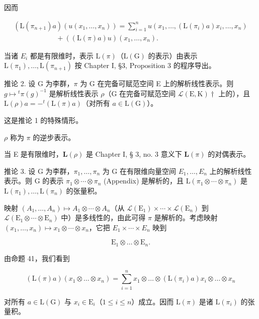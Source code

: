 因而

\[
\begin{array}{l} (\mathrm{L} (\pi_ {n + 1}) a) (u (x _ {1}, \ldots , x _ {n})) = \sum_ {i = 1} ^ {n} u (x _ {1}, \ldots , (\mathrm{L} (\pi_ {i}) a) x _ {i}, \ldots , x _ {n}) \\ \qquad \qquad \qquad + ((\mathrm{L} (\pi) a) u) (x _ {1}, \ldots , x _ {n}). \end{array}
\]

当诸 \(E_{i}\) 都是有限维时，表示 \(\mathrm{L}(\pi)\)（\(\mathrm{L}(\mathrm{G})\) 的表示）由表示 \(\mathrm{L}(\pi_{1}),\ldots,\mathrm{L}(\pi_{n+1})\) 按 Chapter I, §3, Proposition 3 的程序导出。

推论 2. 设 G 为李群，\(\pi\) 为 G 在完备可赋范空间 E 上的解析线性表示。则 \(g \mapsto {}^{t}\pi(g)^{-1}\) 是解析线性表示 \(\rho\)（G 在完备可赋范空间 \(\mathcal{L}(\mathrm{E}, \mathrm{K})\dagger\) 上的），且 \(\mathrm{L}(\rho)a = -{}^{t}(\mathrm{L}(\pi)a)\)（对所有 \(a \in \mathrm{L}(\mathrm{G})\)）。

这是推论 1 的特殊情形。

\(\rho\) 称为 \(\pi\) 的逆步表示。

当 E 是有限维时，\(\mathbf{L}(\rho)\) 是 Chapter I, § 3, no. 3 意义下 \(\mathbf{L}(\pi)\) 的对偶表示。

推论 3. 设 G 为李群，\(\pi_1, \ldots, \pi_n\) 为 G 在有限维向量空间 \(E_{1},\ldots,E_{n}\) 上的解析线性表示。则 G 的表示 \(\pi_{1}\otimes\cdots\otimes\pi_{n}\) (Appendix) 是解析的，且 \(\mathrm{L}(\pi_{1}\otimes\cdots\otimes\pi_{n})\) 是 \(\mathrm{L}(\pi_{1}),\ldots,\mathrm{L}(\pi_{n})\) 的张量积。

映射 \((A_{1},\ldots,A_{n})\mapsto A_{1}\otimes\cdots\otimes A_{n}\)（从 \(\mathcal{L}(\mathrm{E}_{1})\times\cdots\times\mathcal{L}(\mathrm{E}_{n})\) 到 \(\mathcal{L}(\mathrm{E}_{1}\otimes\cdots\otimes\mathrm{E}_{n})\) 中）是多线性的，由此可得 \(\pi\) 是解析的。考虑映射 \((x_{1},\ldots,x_{n})\mapsto x_{1}\otimes\cdots\otimes x_{n}\)，它把 \(E_{1}\times\cdots\times E_{n}\) 映到

\[
\mathrm{E} _ {1} \otimes \dots \otimes \mathrm{E} _ {n}.
\]

由命题 41，我们看到

\[
(\mathrm{L} (\pi) a) (x _ {1} \otimes \dots \otimes x _ {n}) = \sum_ {i = 1} ^ {n} x _ {1} \otimes \dots \otimes (\mathrm{L} (\pi_ {i}) a) x _ {i} \otimes \dots \otimes x _ {n}
\]

对所有 \(a \in \mathrm{L}(\mathrm{G})\) 与 \(x_{i} \in \mathrm{E}_{i}\)（\(1 \leqslant i \leqslant n\)）成立。因而 \(\mathrm{L}(\pi)\) 是诸 \(\mathrm{L}(\pi_{i})\) 的张量积。

